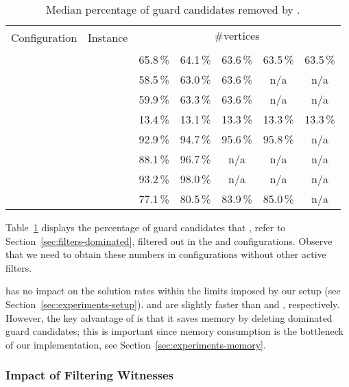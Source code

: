 \begin{table}
	\centering
	\small
	\begin{tabular}{|l|l|ccccc|}
		\hline
		\multirow{2}{*}{Configuration} & \multirow{2}{*}{Instance} & \multicolumn{5}{|c|}{\#vertices} \\
		& &  &  &  &  &  \\
		\hline
		\hline
		\multirow{4}{*}{\vdefault}
			& \walk           & 65.8\,\% & 64.1\,\% & 63.6\,\% & 63.5\,\% & 63.5\,\% \\
			& \sinewalk       & 58.5\,\% & 63.0\,\% & 63.6\,\% &      n/a &      n/a \\
			& \parabolawalk   & 59.9\,\% & 63.3\,\% & 63.6\,\% &      n/a &      n/a \\
			& \concavevalleys & 13.4\,\% & 13.1\,\% & 13.3\,\% & 13.3\,\% & 13.3\,\% \\
		\hline
		\hline
		\multirow{4}{*}{\pnoedge}
			& \walk           & 92.9\,\% & 94.7\,\% & 95.6\,\% & 95.8\,\% &      n/a \\
			& \sinewalk       & 88.1\,\% & 96.7\,\% &      n/a &      n/a &      n/a \\
			& \parabolawalk   & 93.2\,\% & 98.0\,\% &      n/a &      n/a &      n/a \\
			& \concavevalleys & 77.1\,\% & 80.5\,\% & 83.9\,\% & 85.0\,\% &      n/a \\
		\hline
	\end{tabular}
	\caption{Median percentage of guard candidates removed by \domfilter.}
	\label{tab:domfilter}
\end{table}

Table~\ref{tab:domfilter} displays the percentage of guard candidates that \domfilter, refer to Section~\ref{sec:filters-dominated}, filtered out in the \vdefault and \pnoedge configurations.
Observe that we need to obtain these numbers in configurations without other active filters.

\domfilter has no impact on the solution rates within the limits imposed by our setup (see Section~\ref{sec:experiments-setup}).
\vdefault and \pdefault are slightly faster than \vnodom and \pnodom, respectively.
However, the key advantage of \domfilter is that it saves memory by deleting dominated guard candidates;
this is important since memory consumption is the bottleneck of our implementation, see Section~\ref{sec:experiments-memory}.

\subsubsection{Impact of Filtering Witnesses}
\label{sec:experiments-witnesses}

